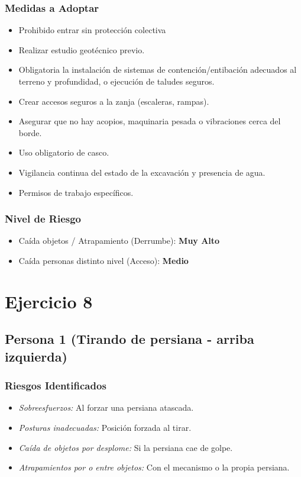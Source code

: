 \documentclass[12pt,a4paper]{article}
\begin{document}
	\subsubsection{Medidas a Adoptar}
	\begin{itemize}
		\item Prohibido entrar sin protección colectiva
		\item Realizar estudio geotécnico previo.
		\item Obligatoria la instalación de sistemas de contención/entibación adecuados al terreno y profundidad, o ejecución de taludes seguros.
		\item Crear accesos seguros a la zanja (escaleras, rampas).
		\item Asegurar que no hay acopios, maquinaria pesada o vibraciones cerca del borde.
		\item Uso obligatorio de casco.
		\item Vigilancia continua del estado de la excavación y presencia de agua.
		\item Permisos de trabajo específicos.
	\end{itemize}
	
	\subsubsection{Nivel de Riesgo}
	\begin{itemize}
		\item Caída objetos / Atrapamiento (Derrumbe): \textbf{Muy Alto}
		\item Caída personas distinto nivel (Acceso): \textbf{Medio}
	\end{itemize}

	
	\section{Ejercicio 8}
	
	\subsection{Persona 1 (Tirando de persiana - arriba izquierda)}
	
	\subsubsection{Riesgos Identificados}
	\begin{itemize}
		\item \textit{Sobreesfuerzos:} Al forzar una persiana atascada.
		\item \textit{Posturas inadecuadas:} Posición forzada al tirar.
		\item \textit{Caída de objetos por desplome:} Si la persiana cae de golpe.
		\item \textit{Atrapamientos por o entre objetos:} Con el mecanismo o la propia persiana.
	\end{itemize}
	
\end{document}
